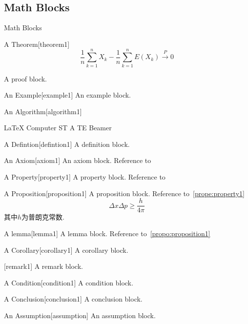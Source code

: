 \documentclass[hyperref, UTF8, CJK, aspectratio=169]{beamer}
\begin{document}
\subsection{Math Blocks}
\begin{frame}{Math Blocks}
	\begin{scutheorem}{A Theorem}[theorem1]
		\begin{equation}
		\dfrac{1}{n} \sum_{k=1}^{n} X_k - \dfrac{1}{n} \sum_{k=1}^{n} E(X_k) \stackrel{\;P\;}{\longrightarrow} 0
		\end{equation}
	\end{scutheorem}
	\begin{scuproof}{}
		A proof block.
	\end{scuproof}
	\begin{scuexample}{An Example}[example1]
		An example block.
	\end{scuexample}
	\begin{scualgorithm}{An Algorithm}[algorithm1]
		\begin{algorithmic}[1]
			\REQUIRE \LaTeX{}
			\ENSURE Computer
			\STATE ST
			\STATE A
			\STATE TE
			\RETURN Beamer
		\end{algorithmic}
	\end{scualgorithm}
	\begin{scudefinition}{A Defintion}[defintion1]
		A definition block.
	\end{scudefinition}
	\begin{scuaxiom}{An Axiom}[axiom1]
		An axiom block. Reference to~
	\end{scuaxiom}
	\begin{scuproperty}{A Property}[property1]
		A property block. Reference to~
	\end{scuproperty}
	\begin{scuproposition}{A Proposition}[proposition1]
		A proposition block. Reference to~\vref{prope:property1}
		\begin{equation}
		\Delta x \Delta p \geq \dfrac{h}{4\pi}
		\end{equation}
		其中$h$为普朗克常数.
	\end{scuproposition}
	\begin{sculemma}{A lemma}[lemma1]
		A lemma block. Reference to~\cref{propo:proposition1}
	\end{sculemma}
	\begin{scucorollary}{A Corollary}[corollary1]
		A corollary block.
	\end{scucorollary}
	\begin{scuremark}{}[remark1]
		A remark block.
	\end{scuremark}
	\begin{scucondition}{A Condition}[condition1]
		A condition block.
	\end{scucondition}
	\begin{scuconclusion}{A Conclusion}[conclusion1]
		A conclusion block.
	\end{scuconclusion}
	\begin{scuassumption}{An Assumption}[assumption]
		An assumption block.
	\end{scuassumption}
\end{frame}
\end{document}
